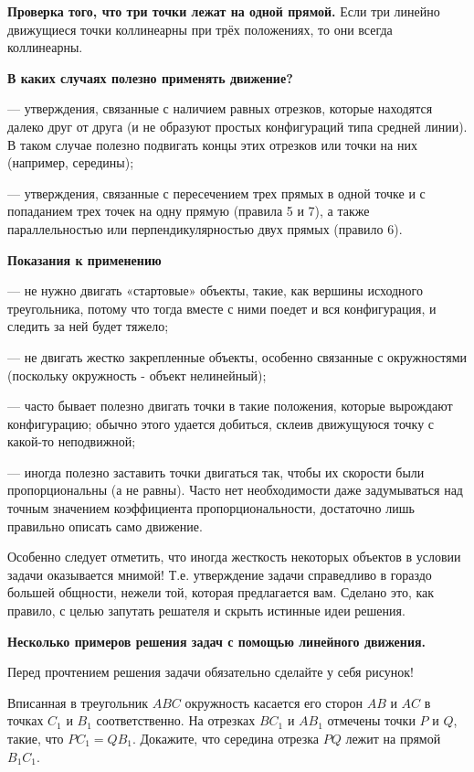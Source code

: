 \textbf{Проверка того, что три точки лежат на одной прямой.} Если три линейно движущиеся точки коллинеарны при трёх положениях, то они всегда коллинеарны.


\newpage

\centerline{\bf \Huge }

\textbf{В каких случаях полезно применять движение?}

--- утверждения, связанные с наличием равных отрезков, которые находятся далеко друг от друга (и не образуют простых конфигураций типа средней линии). В таком случае полезно подвигать концы этих отрезков или точки на них (например, середины);

--- утверждения, связанные с пересечением трех прямых в одной точке и с попаданием трех точек на одну прямую (правила 5 и 7), а также параллельностью или перпендикулярностью двух прямых (правило 6).


\textbf{Показания к применению}

--- не нужно двигать «стартовые» объекты, такие, как вершины исходного треугольника, потому что тогда вместе с ними поедет и вся конфигурация, и следить за ней будет тяжело;

--- не двигать жестко закрепленные объекты, особенно связанные с окружностями (поскольку окружность - объект нелинейный);

--- часто бывает полезно двигать точки в такие положения, которые вырождают конфигурацию; обычно этого удается добиться, склеив движущуюся точку с какой-то неподвижной;

--- иногда полезно заставить точки двигаться так, чтобы их скорости были пропорциональны (а не равны). Часто нет необходимости даже задумываться над точным значением коэффициента пропорциональности, достаточно лишь правильно описать само движение.

Особенно следует отметить, что иногда жесткость некоторых объектов в условии задачи оказывается мнимой! Т.е. утверждение задачи справедливо в гораздо большей общности, нежели той, которая предлагается вам. Сделано это, как правило, с целью запутать решателя и скрыть истинные идеи решения.


\newpage

\centerline{\bf \Huge }

\textbf{Несколько примеров решения задач с помощью линейного движения.}

Перед прочтением решения задачи обязательно сделайте у себя рисунок!

Вписанная в треугольник $A B C$ окружность касается его сторон $A B$ и $A C$ в точках $C_1$ и $B_1$ соответственно. На отрезках $B C_1$ и $A B_1$ отмечены точки $P$ и $Q$, такие, что $P C_1=Q B_1$. Докажите, что середина отрезка $P Q$ лежит на прямой $B_1 C_1$.

